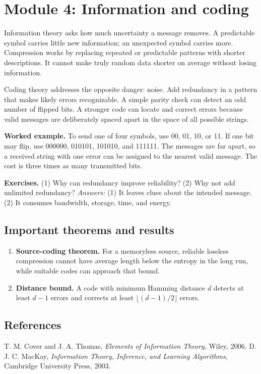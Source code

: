 \documentclass[11pt,oneside]{book}
\makeatletter
\renewenvironment{thebibliography}[1]
  {\list{\@biblabel{\@arabic\c@enumiv}}%
    {\settowidth\labelwidth{\@biblabel{#1}}%
     \leftmargin\labelwidth
     \advance\leftmargin\labelsep
     \usecounter{enumiv}%
     \let\p@enumiv\@empty
     \renewcommand\theenumiv{\@arabic\c@enumiv}}}
  {\endlist}
\makeatother
\begin{document}
\chapter[Module 4: Information and coding]{Module 4: Information and coding}
Information theory asks how much uncertainty a message removes. A predictable symbol carries little new information; an unexpected symbol carries more. Compression works by replacing repeated or predictable patterns with shorter descriptions. It cannot make truly random data shorter on average without losing information.

Coding theory addresses the opposite danger: noise. Add redundancy in a pattern that makes likely errors recognizable. A simple parity check can detect an odd number of flipped bits. A stronger code can locate and correct errors because valid messages are deliberately spaced apart in the space of all possible strings.

\textbf{Worked example.} To send one of four symbols, use 00, 01, 10, or 11. If one bit may flip, use 000000, 010101, 101010, and 111111. The messages are far apart, so a received string with one error can be assigned to the nearest valid message. The cost is three times as many transmitted bits.

\textbf{Exercises.} (1) Why can redundancy improve reliability? (2) Why not add unlimited redundancy? \emph{Answers:} (1) It leaves clues about the intended message. (2) It consumes bandwidth, storage, time, and energy.

\section*{Important theorems and results}
\begin{enumerate}[leftmargin=*,itemsep=0.35em]
\item \textbf{Source-coding theorem.} For a memoryless source, reliable lossless compression cannot have average length below the entropy in the long run, while suitable codes can approach that bound.

\item \textbf{Distance bound.} A code with minimum Hamming distance $d$ detects at least $d-1$ errors and corrects at least $\lfloor(d-1)/2\rfloor$ errors.
\end{enumerate}

\section*{References}
\begin{thebibliography}{9}
 T. M. Cover and J. A. Thomas, \emph{Elements of Information Theory}, Wiley, 2006.
 D. J. C. MacKay, \emph{Information Theory, Inference, and Learning Algorithms}, Cambridge University Press, 2003.
\end{thebibliography}
\end{document}
